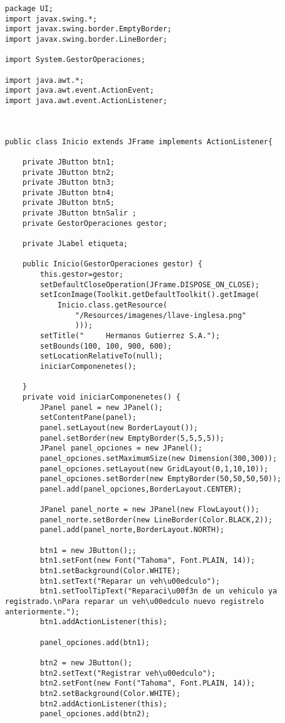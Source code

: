 \begin{lstlisting}[caption=Inicio.java (App Escritorio)]
package UI;
import javax.swing.*;
import javax.swing.border.EmptyBorder;
import javax.swing.border.LineBorder;

import System.GestorOperaciones;

import java.awt.*;
import java.awt.event.ActionEvent;
import java.awt.event.ActionListener;



public class Inicio extends JFrame implements ActionListener{
	
	private JButton btn1;
	private JButton btn2;
	private JButton btn3;
	private JButton btn4;
	private JButton btn5;
	private JButton btnSalir ;
	private GestorOperaciones gestor;
	
	private JLabel etiqueta;

	public Inicio(GestorOperaciones gestor) {
		this.gestor=gestor;
		setDefaultCloseOperation(JFrame.DISPOSE_ON_CLOSE);
		setIconImage(Toolkit.getDefaultToolkit().getImage(
            Inicio.class.getResource( 
                "/Resources/imagenes/llave-inglesa.png" 
                )));
		setTitle("     Hermanos Gutierrez S.A.");
		setBounds(100, 100, 900, 600);
		setLocationRelativeTo(null);
		iniciarComponenetes();		
		
	}
	private void iniciarComponenetes() {
		JPanel panel = new JPanel();
		setContentPane(panel);
		panel.setLayout(new BorderLayout());
		panel.setBorder(new EmptyBorder(5,5,5,5));
		JPanel panel_opciones = new JPanel();
		panel_opciones.setMaximumSize(new Dimension(300,300));
		panel_opciones.setLayout(new GridLayout(0,1,10,10));
		panel_opciones.setBorder(new EmptyBorder(50,50,50,50));
		panel.add(panel_opciones,BorderLayout.CENTER);
		
		JPanel panel_norte = new JPanel(new FlowLayout());
		panel_norte.setBorder(new LineBorder(Color.BLACK,2));
		panel.add(panel_norte,BorderLayout.NORTH);

		btn1 = new JButton();;
		btn1.setFont(new Font("Tahoma", Font.PLAIN, 14));
		btn1.setBackground(Color.WHITE);
		btn1.setText("Reparar un veh\u00edculo");
		btn1.setToolTipText("Reparaci\u00f3n de un vehiculo ya registrado.\nPara reparar un veh\u00edculo nuevo registrelo anteriormente.");
		btn1.addActionListener(this);
		
		panel_opciones.add(btn1);
		
		btn2 = new JButton();
		btn2.setText("Registrar veh\u00edculo");
		btn2.setFont(new Font("Tahoma", Font.PLAIN, 14));
		btn2.setBackground(Color.WHITE);
		btn2.addActionListener(this);
		panel_opciones.add(btn2);
		

\end{lstlisting}
